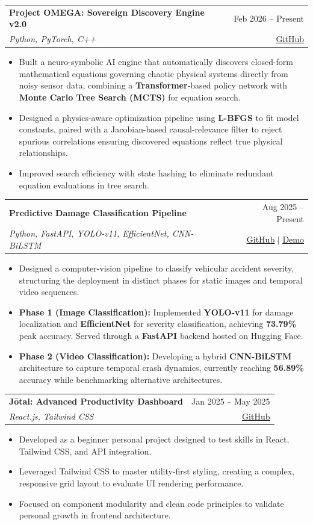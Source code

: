 \documentclass[letterpaper,11pt]{article}
\makeatletter
\newcommand{\resumeItem}[1]{
  \item\small{
    {#1 \vspace{-2pt}}
  }
}
\newcommand{\resumeProjectHeading}[4]{
    \vspace{-2pt}\item
    \begin{tabular*}{0.97\textwidth}[t]{l@{\extracolsep{\fill}}r}
      \small#1 & #2 \\
      \small\emph{#3} & \small#4 \\
    \end{tabular*}\vspace{-7pt}
}
\newcommand{\resumeItemListStart}{\begin{itemize}}
\newcommand{\resumeItemListEnd}{\end{itemize}\vspace{-6pt}}
\makeatother
\begin{document}
      \resumeProjectHeading
          {\textbf{Project OMEGA: Sovereign Discovery Engine v2.0}}{Feb 2026 -- Present}
          {Python, PyTorch, C++}{\href{https://github.com/Mahesh0002/projectOmega}{\underline{GitHub}}}
          \resumeItemListStart
            \resumeItem{Built a neuro-symbolic AI engine that automatically discovers closed-form mathematical equations governing chaotic physical systems directly from noisy sensor data, combining a \textbf{Transformer}-based policy network with \textbf{Monte Carlo Tree Search (MCTS)} for equation search.}
            \resumeItem{Designed a physics-aware optimization pipeline using \textbf{L-BFGS} to fit model constants, paired with a Jacobian-based causal-relevance filter to reject spurious correlations ensuring discovered equations reflect true physical relationships.}
            \resumeItem{Improved search efficiency with state hashing to eliminate redundant equation evaluations in tree search.}
          \resumeItemListEnd

      \resumeProjectHeading
          {\textbf{Predictive Damage Classification Pipeline}}{Aug 2025 -- Present}
          {Python, FastAPI, YOLO-v11, EfficientNet, CNN-BiLSTM}{\href{https://github.com/Mahesh0002/Accident-Severity}{\underline{GitHub}} $|$ \href{https://trafficaccidentseverity.l7310956.workers.dev/}{\underline{Demo}}}
          \resumeItemListStart
            \resumeItem{Designed a computer-vision pipeline to classify vehicular accident severity, structuring the deployment in distinct phases for static images and temporal video sequences.}
            \resumeItem{\textbf{Phase 1 (Image Classification):} Implemented \textbf{YOLO-v11} for damage localization and \textbf{EfficientNet} for severity classification, achieving \textbf{73.79\%} peak accuracy. Served through a \textbf{FastAPI} backend hosted on Hugging Face.}
            \resumeItem{\textbf{Phase 2 (Video Classification):} Developing a hybrid \textbf{CNN-BiLSTM} architecture to capture temporal crash dynamics, currently reaching \textbf{56.89\%} accuracy while benchmarking alternative architectures.}
          \resumeItemListEnd

      \resumeProjectHeading
          {\textbf{J\=otai: Advanced Productivity Dashboard}}{Jan 2025 -- May 2025}
          {React.js, Tailwind CSS}{\href{https://github.com/Mahesh0002/Jotai}{\underline{GitHub}}}
          \resumeItemListStart
            \resumeItem{Developed as a beginner personal project designed to test skills in React, Tailwind CSS, and API integration.}
            \resumeItem{Leveraged Tailwind CSS to master utility-first styling, creating a complex, responsive grid layout to evaluate UI rendering performance.}
            \resumeItem{Focused on component modularity and clean code principles to validate personal growth in frontend architecture.}
          \resumeItemListEnd
\end{document}
